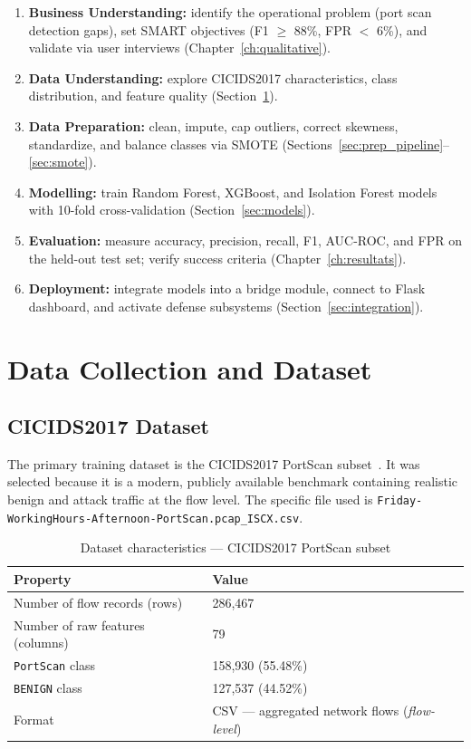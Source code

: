 \documentclass[12pt,a4paper]{report}
\begin{document}
\begin{enumerate}
    \item \textbf{Business Understanding:} identify the operational problem (port scan detection gaps), set SMART objectives (F1 $\geq$ 88\%, FPR $<$ 6\%), and validate via user interviews (Chapter~\ref{ch:qualitative}).
    \item \textbf{Data Understanding:} explore CICIDS2017 characteristics, class distribution, and feature quality (Section~\ref{sec:dataset}).
    \item \textbf{Data Preparation:} clean, impute, cap outliers, correct skewness, standardize, and balance classes via SMOTE (Sections~\ref{sec:prep_pipeline}--\ref{sec:smote}).
    \item \textbf{Modelling:} train Random Forest, XGBoost, and Isolation Forest models with 10-fold cross-validation (Section~\ref{sec:models}).
    \item \textbf{Evaluation:} measure accuracy, precision, recall, F1, AUC-ROC, and FPR on the held-out test set; verify success criteria (Chapter~\ref{ch:resultats}).
    \item \textbf{Deployment:} integrate models into a bridge module, connect to Flask dashboard, and activate defense subsystems (Section~\ref{sec:integration}).
\end{enumerate}

\section{Data Collection and Dataset}\label{sec:dataset}

\subsection{CICIDS2017 Dataset}

The primary training dataset is the CICIDS2017 PortScan subset~\cite{cicids2017}. It was selected because it is a modern, publicly available benchmark containing realistic benign and attack traffic at the flow level. The specific file used is \texttt{Friday-WorkingHours-Afternoon-PortScan.pcap\_ISCX.csv}.

\begin{table}[H]
\centering
\caption{Dataset characteristics --- CICIDS2017 PortScan subset}
\label{tab:dataset}
\begin{tabular}{ll}
\toprule
\textbf{Property} & \textbf{Value} \\
\midrule
Number of flow records (rows) & 286,467 \\
Number of raw features (columns) & 79 \\
\texttt{PortScan} class & 158,930 (55.48\%) \\
\texttt{BENIGN} class & 127,537 (44.52\%) \\
Format & CSV --- aggregated network flows (\textit{flow-level}) \\
\bottomrule
\end{tabular}
\end{table}
\end{document}
